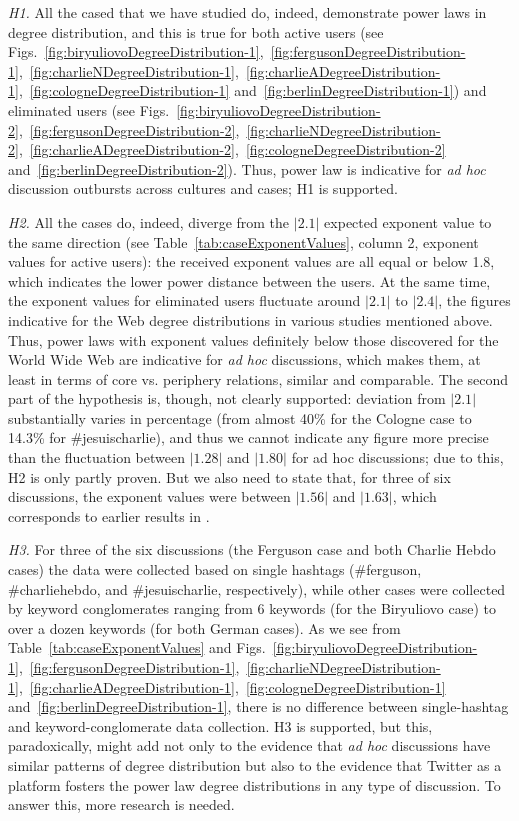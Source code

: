 \textit{H1.} All the cased that we have studied do, indeed, demonstrate power laws in degree distribution, and this is true for both active users (see Figs.~\cref{fig:biryuliovoDegreeDistribution-1},~\cref{fig:fergusonDegreeDistribution-1},~\cref{fig:charlieNDegreeDistribution-1},~\cref{fig:charlieADegreeDistribution-1},~\cref{fig:cologneDegreeDistribution-1} and~\cref{fig:berlinDegreeDistribution-1}) and eliminated users (see Figs.~\cref{fig:biryuliovoDegreeDistribution-2},~\cref{fig:fergusonDegreeDistribution-2},~\cref{fig:charlieNDegreeDistribution-2},~\cref{fig:charlieADegreeDistribution-2},~\cref{fig:cologneDegreeDistribution-2} and~\cref{fig:berlinDegreeDistribution-2}). Thus, power law is indicative for \textit{ad hoc} discussion outbursts across cultures and cases; H1 is supported.

\textit{H2.} All the cases do, indeed, diverge from the \(\lvert2.1\rvert\) expected exponent value to the same direction (see Table~\cref{tab:caseExponentValues}, column 2, exponent values for active users): the received exponent values are all equal or below 1.8, which indicates the lower power distance between the users. At the same time, the exponent values for eliminated users fluctuate around \(\lvert2.1\rvert\) to \(\lvert2.4\rvert\), the figures indicative for the Web degree distributions in various studies mentioned above. Thus, power laws with exponent values definitely below those discovered for the World Wide Web are indicative for \textit{ad hoc} discussions, which makes them, at least in terms of core vs. periphery relations, similar and comparable. The second part of the hypothesis is, though, not clearly supported: deviation from \(\lvert2.1\rvert\) substantially varies in percentage (from almost 40\% for the Cologne case to 14.3\% for \#jesuischarlie), and thus we cannot indicate any figure more precise than the fluctuation between \(\lvert1.28\rvert\) and \(\lvert1.80\rvert\) for ad hoc discussions; due to this, H2 is only partly proven. But we also need to state that, for three of six discussions, the exponent values were between \(\lvert1.56\rvert\) and \(\lvert1.63\rvert\), which corresponds to earlier results in \cite{WelchSchonfeldHe}.

\textit{H3.} For three of the six discussions (the Ferguson case and both Charlie Hebdo cases) the data were collected based on single hashtags (\#ferguson, \#charliehebdo, and \#jesuischarlie, respectively), while other cases were collected by keyword conglomerates ranging from 6 keywords (for the Biryuliovo case) to over a dozen keywords (for both German cases). As we see from Table~\cref{tab:caseExponentValues} and Figs.~\cref{fig:biryuliovoDegreeDistribution-1},~\cref{fig:fergusonDegreeDistribution-1},~\cref{fig:charlieNDegreeDistribution-1},~\cref{fig:charlieADegreeDistribution-1},~\cref{fig:cologneDegreeDistribution-1} and~\cref{fig:berlinDegreeDistribution-1}, there is no difference between single-hashtag and keyword-conglomerate data collection. H3 is supported, but this, paradoxically, might add not only to the evidence that \textit{ad hoc} discussions have similar patterns of degree distribution but also to the evidence that Twitter as a platform fosters the power law degree distributions in any type of discussion. To answer this, more research is needed.

